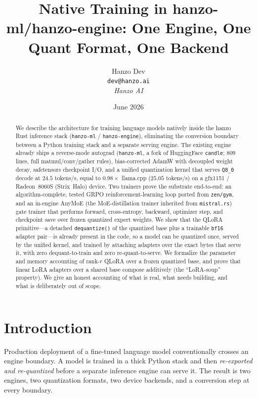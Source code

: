 \documentclass[11pt]{article}
\title{Native Training in hanzo-ml/hanzo-engine: One Engine, One Quant Format, One Backend}
\author{Hanzo Dev \\ \texttt{dev@hanzo.ai} \\ \textit{Hanzo AI}}
\date{June 2026}
\begin{document}
\hanzocoverpage

\begin{abstract}
We describe the architecture for training language models natively inside the hanzo Rust inference stack (\texttt{hanzo-ml} / \texttt{hanzo-engine}), eliminating the conversion boundary between a Python training stack and a separate serving engine. The existing engine already ships a reverse-mode autograd (\texttt{hanzo-ml}, a fork of HuggingFace \texttt{candle}; $809$ lines, full matmul/conv/gather rules), bias-corrected AdamW with decoupled weight decay, safetensors checkpoint I/O, and a unified quantization kernel that serves \texttt{Q8\_0} decode at $24.5$ tokens/s, equal to $0.98\times$ llama.cpp ($25.05$ tokens/s) on a gfx1151 / Radeon~8060S (Strix~Halo) device. Two trainers prove the substrate end-to-end: an algorithm-complete, tested GRPO reinforcement-learning loop ported from \texttt{zen/gym}, and an in-engine AnyMoE (the MoE-distillation trainer inherited from \texttt{mistral.rs}) gate trainer that performs forward, cross-entropy, backward, optimizer step, and checkpoint save over frozen quantized expert weights. We show that the QLoRA primitive---a detached \texttt{dequantize()} of the quantized base plus a trainable \texttt{bf16} adapter pair---is already present in the code, so a model can be quantized once, served by the unified kernel, and trained by attaching adapters over the exact bytes that serve it, with zero dequant-to-train and zero re-quant-to-serve. We formalize the parameter and memory accounting of rank-$r$ QLoRA over a frozen quantized base, and prove that linear LoRA adapters over a shared base compose additively (the ``LoRA-soup'' property). We give an honest accounting of what is real, what needs building, and what is deliberately out of scope.
\end{abstract}

\section{Introduction}

Production deployment of a fine-tuned language model conventionally crosses an engine boundary. A model is trained in a thick Python stack and then \emph{re-exported and re-quantized} before a separate inference engine can serve it. The result is two engines, two quantization formats, two device backends, and a conversion step at every boundary.
\end{document}
